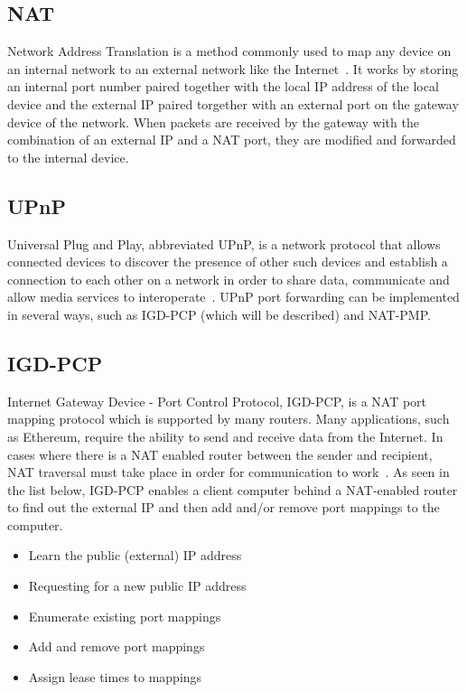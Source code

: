 \subsection{NAT}
Network Address Translation is a method commonly used to map any device on an internal network to an external network like the Internet~\cite{kurose:p349}. It works by storing an internal port number paired together with the local IP address of the local device and the external IP paired torgether with an external port on the gateway device of the network. When packets are received by the gateway with the combination of an external IP and a NAT port, they are modified and forwarded to the internal device.

\subsection{UPnP}
Universal Plug and Play, abbreviated UPnP, is a network protocol that allows connected devices to discover the presence of other such devices and establish a connection to each other on a network in order to share data, communicate and allow media services to interoperate~\cite{kurose:p352}. UPnP port forwarding can be implemented in several ways, such as IGD-PCP (which will be described) and NAT-PMP.

\subsection{IGD-PCP}
Internet Gateway Device - Port Control Protocol, IGD-PCP, is a NAT port mapping protocol which is supported by many routers. Many applications, such as Ethereum, require the ability to send and receive data from the Internet. In cases where there is a NAT enabled router between the sender and recipient, NAT traversal must take place in order for communication to work~\cite{igd-pcp:rfc}. As seen in the list below, IGD-PCP enables a client computer behind a NAT-enabled router to find out the external IP and then add and/or remove port mappings to the computer. 

\begin{itemize}
    \item Learn the public (external) IP address
    \item Requesting for a new public IP address
    \item Enumerate existing port mappings
    \item Add and remove port mappings
    \item Assign lease times to mappings
\end{itemize}